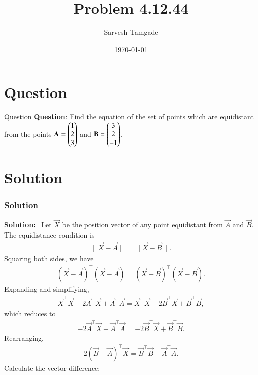 \documentclass{beamer}
\title{Problem 4.12.44}
\author{Sarvesh Tamgade}
\date{\today}
\numberwithin{equation}{section}
\begin{document}
\begin{frame}
\titlepage
\end{frame}

\section{Question}
\begin{frame}{Question}
\textbf{Question}:
Find the equation of the set of points which are equidistant from the points \(\mathbf{A} = \begin{pmatrix}1 \\ 2 \\ 3\end{pmatrix}\) and \(\mathbf{B} = \begin{pmatrix}3 \\ 2 \\ -1\end{pmatrix}\).

\end{frame}

\section{Solution}
\begin{frame}[fragile]
    \frametitle{Solution}
\textbf{Solution:} \
Let \(\vec{X}\) be the position vector of any point equidistant from \(\vec{A}\) and \(\vec{B}\).
The equidistance condition is
\begin{align}
\|\vec{X} - \vec{A}\| = \|\vec{X} - \vec{B}\|.
\end{align}
Squaring both sides, we have
\begin{align}
(\vec{X} - \vec{A})^\top (\vec{X} - \vec{A}) = (\vec{X} - \vec{B})^\top (\vec{X} - \vec{B}).
\end{align}
Expanding and simplifying,
\begin{align}
\vec{X}^\top \vec{X} - 2 \vec{A}^\top \vec{X} + \vec{A}^\top \vec{A} = \vec{X}^\top \vec{X} - 2 \vec{B}^\top \vec{X} + \vec{B}^\top \vec{B},
\end{align}
which reduces to
\begin{align}
-2 \vec{A}^\top \vec{X} + \vec{A}^\top \vec{A} = -2 \vec{B}^\top \vec{X} + \vec{B}^\top \vec{B}.
\end{align}
Rearranging,
\begin{align}
2 (\vec{B} - \vec{A})^\top \vec{X} = \vec{B}^\top \vec{B} - \vec{A}^\top \vec{A}.
\end{align}
Calculate the vector difference:

\end{frame}
\end{document}
